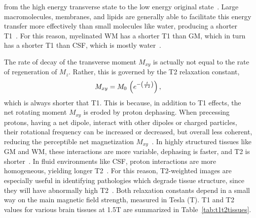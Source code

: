 from the high energy transverse state to the low energy original state~\cite{Bloch1946,Bryant2005}.
Large macromolecules, membranes, and lipids are generally able to facilitate this energy transfer
more effectively than small molecules like water, producing a shorter T1~\cite{Koenig1990}.
For this reason, myelinated WM has a shorter T1 than GM,
which in turn has a shorter T1 than CSF, which is mostly water~\cite{Roberts2007}.
\par
The rate of decay of the transverse moment $M_{xy}$
is actually not equal to the rate of regeneration of $M_z$.
Rather, this is governed by the T2 relaxation constant,
\begin{equation}
  M_{xy} = M_0\et\left(e^{-\left(\frac{t}{T2}\right)}\right),%
  \label{eq:T2}
\end{equation}
which is always shorter that T1.
This is because, in addition to T1 effects,
the net rotating moment $M_{xy}$ is eroded by proton dephasing.
When precessing protons, having a net dipole, interact with other dipoles or charged particles,
their rotational frequency can be increased or decreased, but overall less coherent,
reducing the perceptible net magnetization $M_{xy}$~\cite{Bloch1946}.
In highly structured tissues like GM and WM, these interactions are more variable,
dephasing is faster, and T2 is shorter~\cite{Roberts2007}.
In fluid environments like CSF, proton interactions are more homogeneous,
yielding longer T2~\cite{Roberts2007}.
For this reason, T2-weighted images are especially useful in identifying pathologies
which degrade tissue structure, since they will have abnormally high T2~\cite{Roberts2007}.
Both relaxation constants depend in a small way on the main magnetic field strength,
measured in Tesla (T).
T1 and T2 values for various brain tissues at 1.5T are summarized in Table~\ref{tab:t1t2tissues}.
\par
\begin{table}
  \caption{T1 and T2 constants for brain tissues at 1.5 Tesla.}%
  \label{tab:t1t2tissues}
\end{table}

